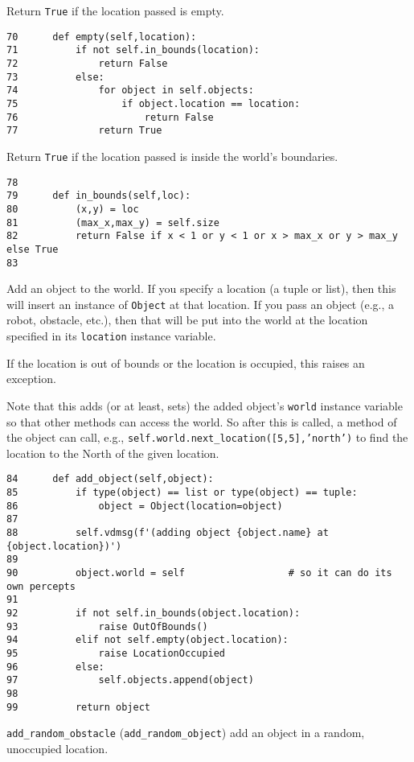 \documentclass[11pt]{tufte-handout}
\begin{document}
Return \texttt{True} if the location passed is empty.

\begin{verbatim}
70      def empty(self,location):
71          if not self.in_bounds(location):
72              return False
73          else:
74              for object in self.objects:
75                  if object.location == location:
76                      return False
77              return True
\end{verbatim}

Return \texttt{True} if the location passed is inside the world's boundaries.
\begin{verbatim}
78  
79      def in_bounds(self,loc):
80          (x,y) = loc
81          (max_x,max_y) = self.size
82          return False if x < 1 or y < 1 or x > max_x or y > max_y else True
83  
\end{verbatim}

Add an object to the world.  If you specify a location (a tuple or list), then this will insert an instance of \texttt{Object} at that location.  If you pass an object (e.g., a robot, obstacle, etc.), then that will be put into the world at the location specified in its \texttt{location} instance variable.

If the location is out of bounds or the location is occupied, this raises an exception.

Note that this adds (or at least, sets) the added object's \texttt{world} instance variable so that other methods can access the world.  So after this is called, a method of the object can call, e.g., \texttt{self.world.next\_location([5,5],'north')} to find the location to the North of the given location.

\begin{verbatim}
84      def add_object(self,object):
85          if type(object) == list or type(object) == tuple:
86              object = Object(location=object)
87  
88          self.vdmsg(f'(adding object {object.name} at {object.location})')
89  
90          object.world = self                  # so it can do its own percepts
91  
92          if not self.in_bounds(object.location):
93              raise OutOfBounds()
94          elif not self.empty(object.location):
95              raise LocationOccupied
96          else:
97              self.objects.append(object)
98  
99          return object
\end{verbatim}

\texttt{add\_random\_obstacle} (\texttt{add\_random\_object}) add an object in a random, unoccupied location.
\end{document}
